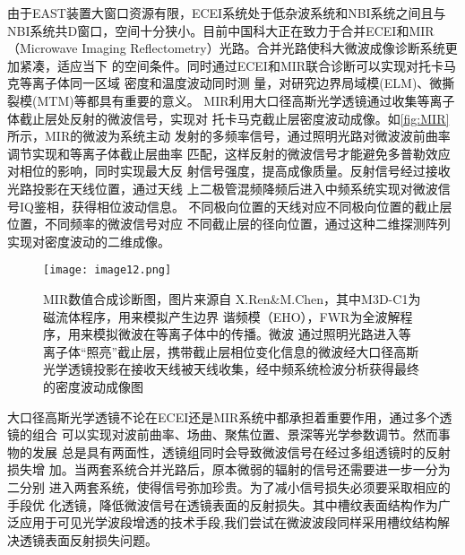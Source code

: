 由于EAST装置大窗口资源有限，ECEI系统处于低杂波系统和NBI系统之间且与NBI系统共D窗口，空间十分狭小。目前中国科大正在致力于合并ECEI和MIR（Microwave Imaging  
Reflectometry）光路。合并光路使科大微波成像诊断系统更加紧凑，适应当下
的空间条件。同时通过ECEI和MIR联合诊断可以实现对托卡马克等离子体同一区域
密度和温度波动同时测
量，对研究边界局域模(ELM)、微撕裂模(MTM)等都具有重要的意义。
MIR利用大口径高斯光学透镜通过收集等离子体截止层处反射的微波信号，实现对
托卡马克截止层密度波动成像\cite{mazzucato2001microwave}。如\autoref{fig:MIR}所示，MIR的微波为系统主动
发射的多频率信号，通过照明光路对微波波前曲率调节实现和等离子体截止层曲率
匹配，这样反射的微波信号才能避免多普勒效应对相位的影响，同时实现最大反
射信号强度，提高成像质量。反射信号经过接收光路投影在天线位置，通过天线
上二极管混频降频后进入中频系统实现对微波信号IQ鉴相，获得相位波动信息。
不同极向位置的天线对应不同极向位置的截止层位置，不同频率的微波信号对应
不同截止层的径向位置，通过这种二维探测阵列实现对密度波动的二维成像。
\begin{figure}[ht]
\centering
\texttt{[image: image12.png]}
\caption{\label{fig:MIR}MIR数值合成诊断图，图片来源自
X.Ren\&M.Chen\cite{RN1190}，其中M3D-C1为磁流体程序，用来模拟产生边界
谐频模（EHO），FWR为全波解程序，用来模拟微波在等离子体中的传播。微波
通过照明光路进入等离子体“照亮”截止层，携带截止层相位变化信息的微波经大口径高斯光学透镜投影在接收天线被天线收集，经中频系统检波分析获得最终的密度波动成像图}
\end{figure}
\par 
大口径高斯光学透镜不论在ECEI还是MIR系统中都承担着重要作用，通过多个透镜的组合
可以实现对波前曲率、场曲、聚焦位置、景深等光学参数调节。然而事物的发展
总是具有两面性，透镜组同时会导致微波信号在经过多组透镜时的反射损失增
加。当两套系统合并光路后，原本微弱的辐射的信号还需要进一步一分为二分别
进入两套系统，使得信号弥加珍贵。为了减小信号损失必须要采取相应的手段优
化透镜，降低微波信号在透镜表面的反射损失。其中槽纹表面结构作为广泛应用于可见光学波段增透的技术手段\cite{savin2015black},我们尝试在微波波段同样采用槽纹结构解决透镜表面反射损失问题。
